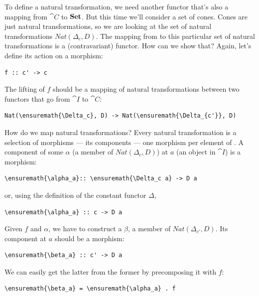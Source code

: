 \noindent
To define a natural transformation, we need another functor that's also
a mapping from $\cat{C}$ to $\mathbf{Set}$. But this time we'll consider a
set of cones. Cones are just natural transformations, so we are looking
at the set of natural transformations $Nat(\Delta_c, D)$. The mapping
from  to this particular set of natural transformations is a
(contravariant) functor. How can we show that? Again, let's define its
action on a morphism:

\begin{Verbatim}
f :: c' -> c
\end{Verbatim}

The lifting of $f$ should be a mapping of natural transformations
between two functors that go from $\cat{I}$ to $\cat{C}$:

\begin{Verbatim}[commandchars=\\\{\}]
Nat(\ensuremath{\Delta_c}, D) -> Nat(\ensuremath{\Delta_{c'}}, D)
\end{Verbatim}

How do we map natural transformations? Every natural transformation is a
selection of morphisms --- its components --- one morphism per element
of . A component of some $\alpha$ (a member of $Nat(\Delta_c, D)$) at
$a$ (an object in $\cat{I}$) is a morphism:

\begin{Verbatim}[commandchars=\\\{\}]
\ensuremath{\alpha_a}:: \ensuremath{\Delta_c a} -> D a
\end{Verbatim}

or, using the definition of the constant functor $\Delta$,

\begin{Verbatim}[commandchars=\\\{\}]
\ensuremath{\alpha_a} :: c -> D a
\end{Verbatim}

Given $f$ and $\alpha$, we have to construct a $\beta$, a member of
$Nat(\Delta_{c'}, D)$. Its component at $a$ should be a
morphism:

\begin{Verbatim}[commandchars=\\\{\}]
\ensuremath{\beta_a} :: c' -> D a
\end{Verbatim}

We can easily get the latter from the former by precomposing it with
$f$:

\begin{Verbatim}[commandchars=\\\{\}]
\ensuremath{\beta_a} = \ensuremath{\alpha_a} . f
\end{Verbatim}

